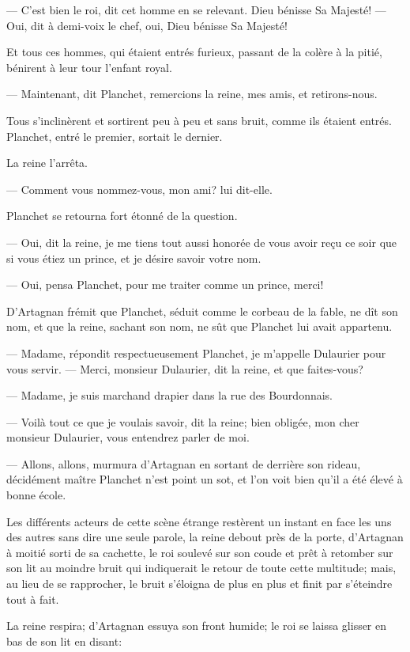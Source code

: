 — C'est bien le roi, dit cet homme en se relevant. Dieu bénisse Sa Majesté!
— Oui, dit à demi-voix le chef, oui, Dieu bénisse Sa Majesté!

Et tous ces hommes, qui étaient entrés furieux, passant de la colère à la pitié, bénirent à leur tour l'enfant royal.

— Maintenant, dit Planchet, remercions la reine, mes amis, et retirons-nous.

Tous s'inclinèrent et sortirent peu à peu et sans bruit, comme ils étaient entrés. Planchet, entré le premier, sortait le dernier.

La reine l'arrêta.

— Comment vous nommez-vous, mon ami? lui dit-elle.

Planchet se retourna fort étonné de la question.

— Oui, dit la reine, je me tiens tout aussi honorée de vous avoir reçu ce soir que si vous étiez un prince, et je désire savoir votre nom.

— Oui, pensa Planchet, pour me traiter comme un prince, merci!

D'Artagnan frémit que Planchet, séduit comme le corbeau de la fable, ne dît son nom, et que la reine, sachant son nom, ne sût que Planchet lui avait appartenu.

— Madame, répondit respectueusement Planchet, je m'appelle Dulaurier pour vous servir.
— Merci, monsieur Dulaurier, dit la reine, et que faites-vous?

— Madame, je suis marchand drapier dans la rue des Bourdonnais.

— Voilà tout ce que je voulais savoir, dit la reine; bien obligée, mon cher monsieur Dulaurier, vous entendrez parler de moi.

— Allons, allons, murmura d'Artagnan en sortant de derrière son rideau, décidément maître Planchet n'est point un sot, et l'on voit bien qu'il a été élevé à bonne école.

Les différents acteurs de cette scène étrange restèrent un instant en face les uns des autres sans dire une seule parole, la reine debout près de la porte, d'Artagnan à moitié sorti de sa cachette, le roi soulevé sur son coude et prêt à retomber sur son lit au moindre bruit qui indiquerait le retour de toute cette multitude; mais, au lieu de se rapprocher, le bruit s'éloigna de plus en plus et finit par s'éteindre tout à fait.

La reine respira; d'Artagnan essuya son front humide; le roi se laissa glisser en bas de son lit en disant:


